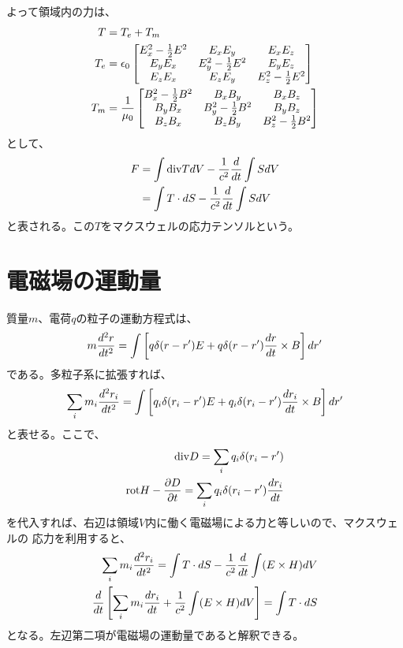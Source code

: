         よって領域内の力は、
        \begin{align*}
            T &= T_e+T_m\\
            T_e &= \epsilon_0\begin{bmatrix}
                  E_x^2-\rec{2}E^2 & E_xE_y & E_xE_z\\
                  E_yE_x & E_y^2-\rec{2}E^2 & E_yE_z\\
                  E_zE_x & E_zE_y & E_z^2-\rec{2}E^2
                  \end{bmatrix}\\
            T_m &= \rec{\mu_0}\begin{bmatrix}
                  B_x^2-\rec{2}B^2 & B_xB_y & B_xB_z\\
                  B_yB_x & B_y^2-\rec{2}B^2 & B_yB_z\\
                  B_zB_x & B_zB_y & B_z^2-\rec{2}B^2
                  \end{bmatrix}
        \end{align*}
        として、
        \begin{align*}
            F &= \int \dive TdV - \rec{c^2}\de{t}\int SdV\\
            &= \int T\cdot dS - \rec{c^2}\de{t}\int SdV
        \end{align*}
        と表される。この$T$をマクスウェルの応力テンソルという。
    \section{電磁場の運動量}
        質量$m$、電荷$q$の粒子の運動方程式は、
            \[m\dd[r]{t} = \int \llr{q\delta(r-r')E
            + q\delta(r-r')\de[r]{t}\times B}dr'\]
        である。多粒子系に拡張すれば、
            \[\sum_i m_i\dd[r_i]{t} = \int \llr{q_i\delta(r_i-r')E
            + q_i\delta(r_i-r')\de[r_i]{t}\times B}dr'\]
        と表せる。ここで、
        \begin{align*}
            \dive D = \sum_i q_i\delta(r_i-r')\\
            \rot H-\pd[D]{t} = \sum_i q_i\delta(r_i-r')\di[r_i]{t}
        \end{align*}
        を代入すれば、右辺は領域$V$内に働く電磁場による力と等しいので、マクスウェルの
        応力を利用すると、
        \begin{align*}
            \sum_i m_i\dd[r_i]{t} = \int T\cdot dS - \rec{c^2}\de{t}\int(E\times H)dV\\
            \di{t}\llr{\sum_i m_i\di[r_i]{t} + \rec{c^2}\int(E\times H)dV}
            = \int T\cdot dS
        \end{align*}
        となる。左辺第二項が電磁場の運動量であると解釈できる。